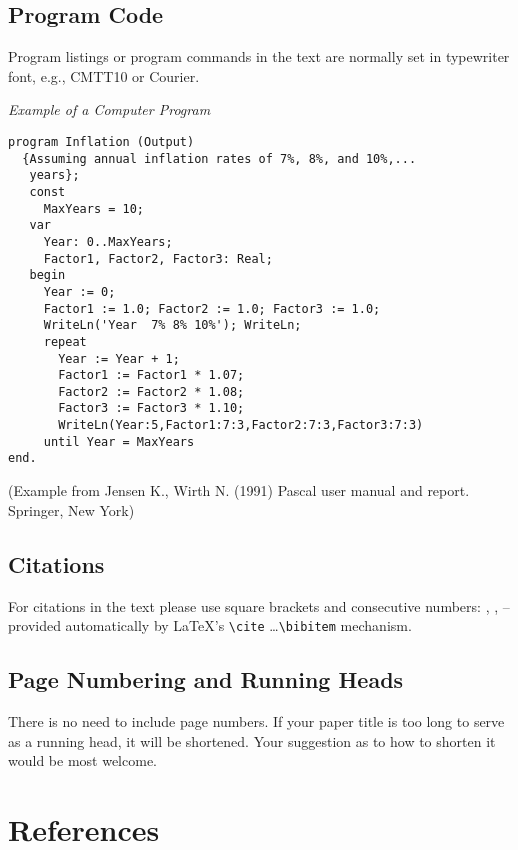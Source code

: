 \documentclass[runningheads,a4paper]{llncs}
\begin{document}
\subsection{Program Code}

Program listings or program commands in the text are normally set in
typewriter font, e.g., CMTT10 or Courier.

\medskip

\noindent
{\it Example of a Computer Program}
\begin{verbatim}
program Inflation (Output)
  {Assuming annual inflation rates of 7%, 8%, and 10%,...
   years};
   const
     MaxYears = 10;
   var
     Year: 0..MaxYears;
     Factor1, Factor2, Factor3: Real;
   begin
     Year := 0;
     Factor1 := 1.0; Factor2 := 1.0; Factor3 := 1.0;
     WriteLn('Year  7% 8% 10%'); WriteLn;
     repeat
       Year := Year + 1;
       Factor1 := Factor1 * 1.07;
       Factor2 := Factor2 * 1.08;
       Factor3 := Factor3 * 1.10;
       WriteLn(Year:5,Factor1:7:3,Factor2:7:3,Factor3:7:3)
     until Year = MaxYears
end.
\end{verbatim}
%
\noindent
{\small (Example from Jensen K., Wirth N. (1991) Pascal user manual and
report. Springer, New York)}

\subsection{Citations}

For citations in the text please use
square brackets and consecutive numbers: \cite{jour}, \cite{lncschap},
\cite{proceeding1} -- provided automatically
by \LaTeX 's \verb|\cite| \dots\verb|\bibitem| mechanism.

\subsection{Page Numbering and Running Heads}

There is no need to include page numbers. If your paper title is too
long to serve as a running head, it will be shortened. Your suggestion
as to how to shorten it would be most welcome.

\section{References}\label{references}

\newpage

\end{document}
